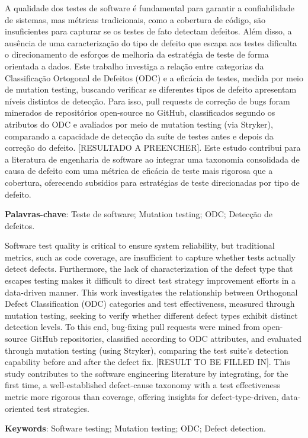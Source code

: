 \documentclass[
    12pt,
    a4paper,
    sumario=tradicional,
    oneside,
    article
]{abntex2}
\begin{document}
\pretextual

\imprimircapa

\begin{resumo}
A qualidade dos testes de software é fundamental para garantir a
confiabilidade de sistemas, mas métricas tradicionais, como a
cobertura de código, são insuficientes para capturar se os testes
de fato detectam defeitos. Além disso, a ausência de uma
caracterização do tipo de defeito que escapa aos testes dificulta
o direcionamento de esforços de melhoria da estratégia de teste de
forma orientada a dados. Este trabalho investiga a relação entre
categorias da Classificação Ortogonal de Defeitos (ODC) e a
eficácia de testes, medida por meio de mutation testing, buscando
verificar se diferentes tipos de defeito apresentam níveis
distintos de detecção. Para isso, pull requests de correção de
bugs foram minerados de repositórios open-source no GitHub,
classificados segundo os atributos do ODC e avaliados por meio de
mutation testing (via Stryker), comparando a capacidade de
detecção da suíte de testes antes e depois da correção do defeito.
[RESULTADO A PREENCHER]. Este estudo contribui para a literatura
de engenharia de software ao integrar uma taxonomia consolidada de
causa de defeito com uma métrica de eficácia de teste mais
rigorosa que a cobertura, oferecendo subsídios para estratégias de
teste direcionadas por tipo de defeito.

 \noindent
 \textbf{Palavras-chave}: Teste de software; Mutation testing; ODC; Detecção de defeitos.
\end{resumo}

\begin{resumo}[Abstract]
Software test quality is critical to ensure system reliability, but
traditional metrics, such as code coverage, are insufficient to
capture whether tests actually detect defects. Furthermore, the
lack of characterization of the defect type that escapes testing
makes it difficult to direct test strategy improvement efforts in
a data-driven manner. This work investigates the relationship
between Orthogonal Defect Classification (ODC) categories and test
effectiveness, measured through mutation testing, seeking to
verify whether different defect types exhibit distinct detection
levels. To this end, bug-fixing pull requests were mined from
open-source GitHub repositories, classified according to ODC
attributes, and evaluated through mutation testing (using Stryker),
comparing the test suite's detection capability before and after
the defect fix. [RESULT TO BE FILLED IN]. This study contributes to
the software engineering literature by integrating, for the first
time, a well-established defect-cause taxonomy with a test
effectiveness metric more rigorous than coverage, offering insights
for defect-type-driven, data-oriented test strategies.

 \vspace{1em}
 \noindent
 \textbf{Keywords}: Software testing; Mutation testing; ODC; Defect detection.
\end{resumo}
\end{document}
